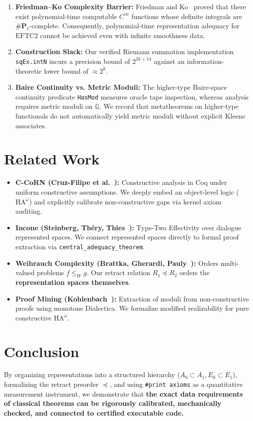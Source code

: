 \documentclass[11pt,a4paper]{article}
\theoremstyle{definition}
\theoremstyle{remark}
\newcommand{\HAomega}{\ensuremath{\mathrm{HA}^\omega}}
\newcommand{\Q}{\ensuremath{\mathbb{Q}}}
\begin{document}
\begin{enumerate}
    \item \textbf{Friedman--Ko Complexity Barrier:} Friedman and Ko~\cite{friedman1982} proved that there exist polynomial-time computable $C^\infty$ functions whose definite integrals are $\#\mathbf{P}_1$-complete. Consequently, polynomial-time representation adequacy for $\text{EFTC2}$ cannot be achieved even with infinite smoothness data.
    \item \textbf{Construction Slack:} Our verified Riemann summation implementation \texttt{sqEx.intN} incurs a precision bound of $2^{2k+14}$ against an information-theoretic lower bound of $\approx 2^k$.
    \item \textbf{Baire Continuity vs. Metric Moduli:} The higher-type Baire-space continuity predicate \texttt{HasMod} measures oracle tape inspection, whereas analysis requires metric moduli on $\Q$. We record that metatheorems on higher-type functionals do not automatically yield metric moduli without explicit Kleene associates.
\end{enumerate}

\section{Related Work}

\begin{itemize}
    \item \textbf{C-CoRN (Cruz-Filipe et al.~\cite{cruzfilipe2004}):} Constructive analysis in Coq under uniform constructive assumptions. We deeply embed an object-level logic ($\HAomega$) and explicitly calibrate non-constructive gaps via kernel axiom auditing.
    \item \textbf{Incone (Steinberg, Th\'ery, Thies~\cite{steinberg2017,steinberg2022}):} Type-Two Effectivity over dialogue represented spaces. We connect represented spaces directly to formal proof extraction via \texttt{central\_adequacy\_theorem}.
    \item \textbf{Weihrauch Complexity (Brattka, Gherardi, Pauly~\cite{brattka2021}):} Orders multi-valued problems $f \le_W g$. Our retract relation $R_1 \preceq R_2$ orders the \textbf{representation spaces themselves}.
    \item \textbf{Proof Mining (Kohlenbach~\cite{kohlenbach2008}):} Extraction of moduli from non-constructive proofs using monotone Dialectica. We formalize modified realizability for pure constructive $\HAomega$.
\end{itemize}

\section{Conclusion}

By organizing representations into a structured hierarchy ($A_0 \subset A_1, E_0 \subset E_1$), formalizing the retract preorder $\preceq$, and using \texttt{\#print axioms} as a quantitative measurement instrument, we demonstrate that \textbf{the exact data requirements of classical theorems can be rigorously calibrated, mechanically checked, and connected to certified executable code.}



\end{document}
